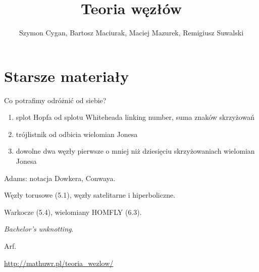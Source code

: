 \documentclass[a4paper, fleqn]{extarticle}
\title{Teoria węzłów}
\author{Szymon Cygan, Bartosz Maciurak, Maciej Mazurek, Remigiusz Suwalski}
\numberwithin{dummy}{section}
\begin{document}
\maketitle
\tableofcontents











\newpage

\raggedright

\section*{Starsze materiały}

Co potrafimy odróżnić od siebie?
\begin{enumerate}
\item splot Hopfa od splotu Whiteheada \dotfill linking number, suma znaków skrzyżowań
\item trójlistnik od odbicia \dotfill wielomian Jonesa
\item dowolne dwa węzły pierwsze o mniej niż dziesięciu skrzyżowaniach \dotfill  wielomian Jonesa
\end{enumerate}

Adams: notacja Dowkera, Conwaya.

Węzły torusowe (5.1), węzły satelitarne i hiperboliczne.

Warkocze (5.4), wielomiany HOMFLY (6.3).

\emph{Bachelor's unknotting}.

Arf.

\url{http://mathuwr.pl/teoria_wezlow/}
\end{document}
